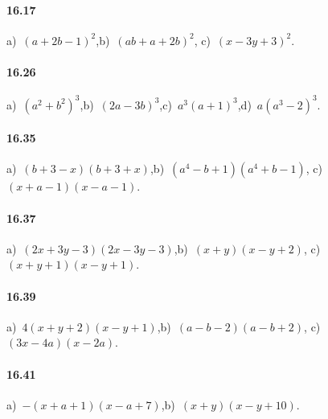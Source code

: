 \paragraph{16.17}
a)~$(a+2b-1)^{2}$,\quad b)~$(ab+a+2b)^{2}$, \quad c)~$(x-3y+3)^{2}$.

\paragraph{16.26}
a)~$\left(a^{2}+b^{2}\right)^{3}$,\quad b)~$(2a-3b)^{3}$,\quad c)~$a^{3}(a+1)^{3}$,\quad d)~$a\left(a^3-2\right)^3$.

\paragraph{16.35}
a)~$(b+3-x)(b+3+x)$,\quad b)~$(a^{4}-b+1)(a^{4}+b-1)$, \quad c)~$(x+a-1)(x-a-1)$.

\paragraph{16.37}
a)~$(2x+3y-3)(2x-3y-3)$,\quad b)~$(x+y)(x-y+2)$, \quad c)~$(x+y+1)(x-y+1)$.

\paragraph{16.39}
a)~$4(x+y+2)(x-y+1)$,\quad b)~$(a-b-2)(a-b+2)$, \quad c)~$(3x-4a)(x-2a)$.

\paragraph{16.41}
a)~$-(x+a+1)(x-a+7)$,\quad b)~$(x+y)(x-y+10)$.
